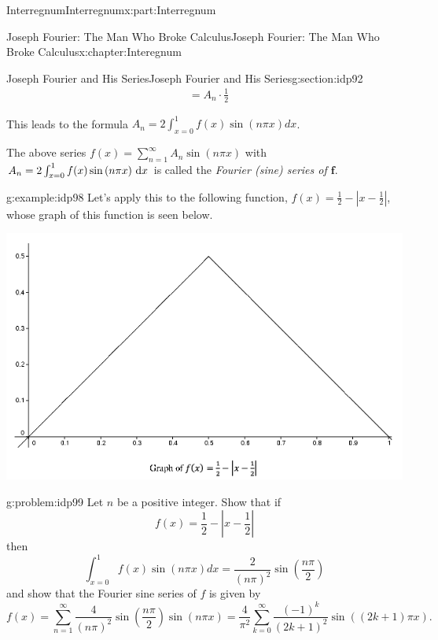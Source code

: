 \documentclass[oneside,10pt,]{book}
\numberwithin{equation}{section}
\newcommand{\dx}[1]{\,{\rm d}#1}
\newcommand{\abs}[1]{\left|#1\right|}
\newcommand{\amp}{&}
\begin{document}
\begin{partptx}{Interregnum}{}{Interregnum}{}{}{x:part:Interregnum}
\begin{chapterptx}{Joseph Fourier: The Man Who Broke Calculus}{}{Joseph Fourier: The Man Who Broke Calculus}{}{}{x:chapter:Interegnum}
\begin{sectionptx}{Joseph Fourier and His Series}{}{Joseph Fourier and His Series}{}{}{g:section:idp92}
\begin{align*}
\amp =A_n\cdot\frac{1}{2}
\end{align*}
%
\par
This leads to the formula \(A_n=2\int_{x=0}^1f(x)\sin\left(n\pi x\right)d x\).%
\par
The above series \(f(x)=\sum_{n=1}^\infty A_n\sin\left(n\pi x\right)\) with \(A_n=2\int_{x=0}^1f(x)\sin\left(n\pi x\right)\dx{ x}\) is called the \emph{Fourier (sine) series of \(\boldsymbol{f}\)}.%
\begin{example}{}{g:example:idp98}%
Let's apply this to the following function, \(f(x)=\frac{1}{2}-\abs{x-\frac{1}{2}}\), whose graph of this function is seen below.%
\begin{image}{0.125}{0.75}{0.125}%
\includegraphics[width=\linewidth]{images/FourierEx1.png}
\end{image}%
\end{example}
\begin{problem}{}{g:problem:idp99}%
 Let \(n\) be a positive integer. Show that if%
\begin{equation*}
f(x)=\frac{1}{2}-\abs{x-\frac{1}{2}}
\end{equation*}
then%
\begin{equation*}
\int_{x=0}^1f(x)\sin\left(n\pi x\right)d x = \frac{2}{\left(n\pi\right)^2}\sin\left(\frac{n\pi}{2}\right)
\end{equation*}
and show that the Fourier sine series of \(f\) is given by%
\begin{equation*}
f(x)=\sum_{n=1}^\infty\frac{4}{\left(n\pi\right)^2}\sin\left(\frac{n\pi}{2} \right)\sin\left(n\pi x\right)=\frac{4}{\pi^2}\sum_{k=0}^\infty\frac{\left(-1\right)^k}{\left(2k+1\right)^2}\sin\left(\left(2k+1\right)\pi x\right).{}
\end{equation*}

\end{problem}
\end{sectionptx}
\end{chapterptx}
\end{partptx}
\end{document}
